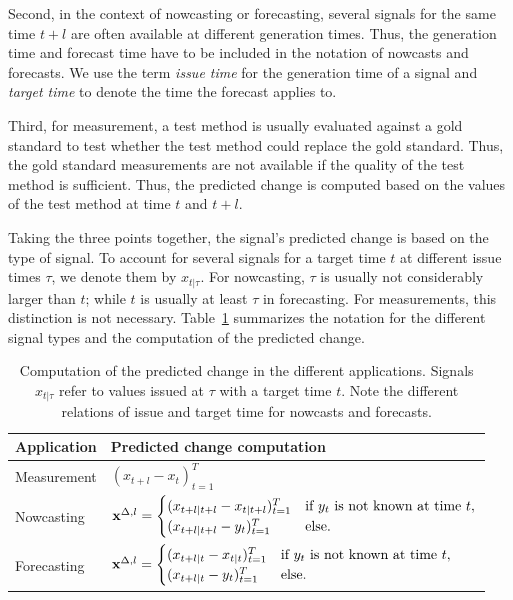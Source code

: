 Second, in the context of nowcasting or forecasting, several signals for the same time $t + l$ are often available at different generation times.
Thus, the generation time and forecast time have to be included in the notation of nowcasts and forecasts.
We use the term \textit{issue time} for the generation time of a signal and \textit{target time} to denote the time the forecast applies to.

Third, for measurement, a test method is usually evaluated against a gold standard to test whether the test method could replace the gold standard.
Thus, the gold standard measurements are not available if the quality of the test method is sufficient. 
Thus, the predicted change is computed based on the values of the test method at time $t$ and $t + l$.

Taking the three points together, the signal's predicted change is based on the type of signal.
To account for several signals for a target time $t$ at different issue times $\tau$, we denote them by $x_{t | \tau}$.
For nowcasting, $\tau$ is usually not considerably larger than $t$; while $t$ is usually at least $\tau$ in forecasting. 
For measurements, this distinction is not necessary.
Table~\ref{tab:notation} summarizes the notation for the different signal types and the computation of the predicted change.

\begin{table}
    \centering
    \begin{tabularx}{0.75\textwidth}{l X}
        \toprule
        Application & Predicted change computation \\
        \midrule
        Measurement & $(x_{t + l} - x_t)_{t=1}^T \label{eq:diffxl_measure} $\\
        Nowcasting & $
\mathbf{x}^{\Delta,l} =
\begin{cases}
(x_{t+l|t+l} -x_{t|t+l})^T_{t=1} & \text{if } y_{t} \text{ is not known at time } t, \\
(x_{t+l|t+l} -y_{t})^T_{t=1} & \text{else}.
\end{cases} \label{eq:diffxl_nowcasting}
$ \\
        Forecasting & $
\mathbf{x}^{\Delta,l} =
\begin{cases}
(x_{t+l|t} - x_{t|t})^T_{t=1} & \text{if } y_{t} \text{ is not known at time } t, \\
(x_{t+l|t} - y_{t})^T_{t=1}  & \text{else}.
\end{cases} \label{eq:diffxl_forecasting}
$\\
        \bottomrule
    \end{tabularx}
    \caption{Computation of the predicted change in the different applications. Signals $x_{t | \tau}$ refer to values issued at $\tau$ with a target time $t$. Note the different relations of issue and target time for nowcasts and forecasts. }
    \label{tab:notation}
\end{table}


